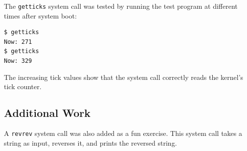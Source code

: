 \documentclass[a4paper]{article}
\begin{document}
The \texttt{getticks} system call was tested by running the test program at different times after system boot:

\begin{lstlisting}[style=terminal]
$ getticks
Now: 271
$ getticks
Now: 329
\end{lstlisting}

The increasing tick values show that the system call correctly reads the kernel's tick counter.

\subsection{Additional Work}

A \texttt{revrev} system call was also added as a fun exercise. This system call takes a string as input, reverses it, and prints the reversed string.
\end{document}
